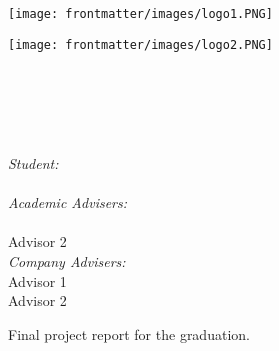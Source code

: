 \begin{titlepage}
\begin{center}
    
	\begin{minipage}{0.48\textwidth} \begin{flushleft}
    \texttt{[image: frontmatter/images/logo1.PNG]}
    \end{flushleft}\end{minipage}
    \begin{minipage}{0.48\textwidth} \begin{flushright}
    \texttt{[image: frontmatter/images/logo2.PNG]}
     \end{flushright}\end{minipage}
     
    \vspace*{1.5cm}

    \textsc{\LARGE \myuniversity}\\[0.2cm]
    \textsc{\large \myschool}\\[1.5cm]
    
    
    \vspace*{1cm}

  { \huge \bfseries \thetitle }\\[0.4cm]	
    \vspace*{2cm}
  
  { \large 
    \emph{Student:} \\	
      \theauthor \\
    \vspace*{0.5cm}
    \emph{Academic Advisers:} \\													  
      \myadvisorA \\
      Advisor 2	\\
    \vspace*{0.5cm}
    \emph{Company Advisers:} \\													  
      Advisor 1 \\
      Advisor 2	\\
  }

  \vspace{2cm}
    Final project report for the \mygrade \: graduation.	\\	

  \vspace{3cm} 	
  \begin{center}
    {\thedate}
  \end{center}
 
    
\end{center}
\end{titlepage}